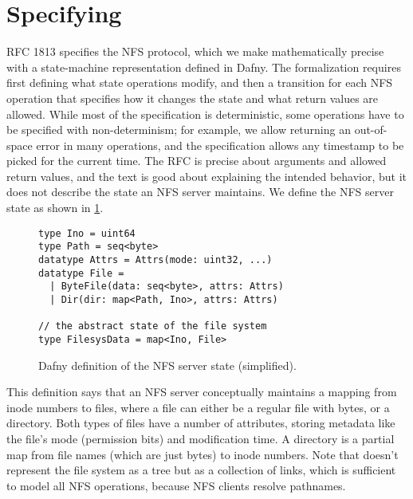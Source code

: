 \section{Specifying \sys}%
\label{sec:spec}

RFC 1813 specifies the NFS protocol, which we make mathematically precise with a
state-machine representation defined in Dafny.
The formalization requires first
defining what state operations modify, and then a transition for each
NFS operation that specifies how it changes the state and what return
values are allowed. While most of the specification is deterministic,
some operations have to be specified with non-determinism; for
example, we allow returning an out-of-space error in many operations,
and the specification allows any timestamp to be picked for the
current time. The RFC is precise about arguments and allowed return
values, and the text is good about explaining the intended behavior,
but it does not describe the state an NFS server maintains.  We define
the NFS server state as shown in \cref{fig:dafny-state}.

\begin{figure}[h]
\begin{small}
\begin{verbatim}
type Ino = uint64
type Path = seq<byte>
datatype Attrs = Attrs(mode: uint32, ...)
datatype File =
  | ByteFile(data: seq<byte>, attrs: Attrs)
  | Dir(dir: map<Path, Ino>, attrs: Attrs)

// the abstract state of the file system
type FilesysData = map<Ino, File>
\end{verbatim}
\end{small}
\vspace{-\baselineskip}
\caption{Dafny definition of the NFS server state (simplified).}
\label{fig:dafny-state}
\end{figure}

This definition says that an NFS server conceptually maintains a mapping from
inode numbers to files, where a file can either be a regular file with
bytes, or a directory. Both types of files have a number of attributes, storing
metadata like the file's mode (permission bits) and modification time. A
directory is a partial map from file names
(which are just bytes) to inode numbers. Note that \sys doesn't
represent the file system as a tree but as a collection of
links, which is sufficient to model all NFS operations, because
NFS clients resolve pathnames.


